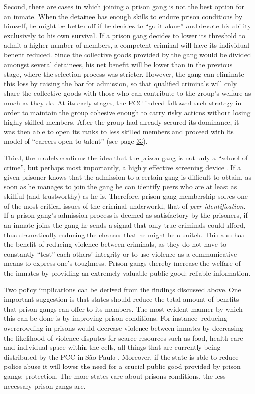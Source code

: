 Second, there are cases in which joining a prison gang is not the best option for an inmate. When the detainee has enough skills to endure prison conditions by himself, he might be better off if he decides to ``go it alone'' and devote his ability exclusively to his own survival. If a prison gang decides to lower its threshold to admit a higher number of members, a competent criminal will have its individual benefit reduced. Since the collective goods provided by the gang would be divided amongst several detainees, his net benefit will be lower than in the previous stage, where the selection process was stricter. However, the gang can eliminate this loss by raising the bar for admission, so that qualified criminals will only share the collective goods with those who can contribute to the group's welfare as much as they do. At its early stages, the PCC indeed followed such strategy in order to maintain the group cohesive enough to carry risky actions without losing highly-skilled members. After the group had already secured its dominance, it was then able to open its ranks to less skilled members and proceed with its model of ``careers open to talent'' (see page \hyperlink{page.33}{33}).

Third, the models confirms the idea that the prison gang is not only a ``school of crime'', but perhaps most importantly, a highly effective screening device \citep[]{gambetta2009codes}. If a given prisoner knows that the admission to a certain gang is difficult to obtain, as soon as he manages to join the gang he can identify peers who are at least as skillful (and trustworthy) as he is. Therefore, prison gang membership solves one of the most critical issues of the criminal underworld, that of \textit{peer identification}. If a prison gang's admission process is deemed as satisfactory by the prisoners, if an inmate joins the gang he sends a signal that only true criminals could afford, thus dramatically reducing the chances that he might be a snitch. This also has the benefit of reducing violence between criminals, as they do not have to constantly ``test'' each others' integrity or to use violence as a communicative means to express one's toughness. Prison gangs thereby increase the welfare of the inmates by providing an extremely valuable public good: reliable information.

Two policy implications can be derived from the findings discussed above. One important suggestion is that states should reduce the total amount of benefits that prison gangs can offer to its members. The most evident manner by which this can be done is by improving prison conditions. For instance, reducing overcrowding in prisons would decrease violence between inmates by decreasing the likelihood of violence disputes for scarce resources such as food, health care and individual space within the cells, all things that are currently being distributed by the PCC in S\~{a}o Paulo \citep[]{dias2009ocupando}. Moreover, if the state is able to reduce police abuse it will lower the need for a crucial public good provided by prison gangs: protection. The more states care about prisons conditions, the less necessary prison gangs are.

